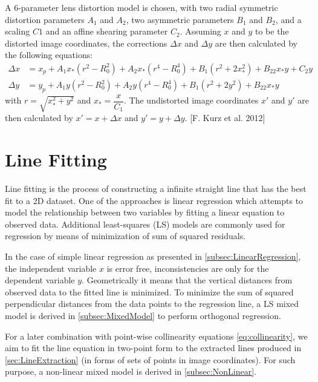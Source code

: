A 6-parameter lens distortion model is chosen, with two radial symmetric distortion parameters $A_1$ and $A_2$, two asymmetric parameters $B_1$ and $B_2$, and a scaling $C1$ and an affine shearing parameter $C_2$. Assuming $x$ and $y$ to be the distorted image coordinates, the corrections $\Delta x$ and $\Delta y$ are then calculated by the following equations:
\begin{equation} \label{eq:LensDistortion}
\begin{split}
\Delta x &= x_p + A_1x_*(r^2-R_0^2) + A_2x_*(r^4-R_0^4) + B_1(r^2+2x_*^2) + B_22x_*y+C_2y \\
\Delta y &= y_p + A_1y  (r^2-R_0^2) + A_2y  (r^4-R_0^4) + B_1(r^2+2y^2)   + B_22x_*y
\end{split}
\end{equation}
with $r=\sqrt{x_*^2+y^2}$ and $x_*=\dfrac{x}{C_1}$. The undistorted image coordinates $x\prime$ and $y\prime$ are then calculated by $x\prime=x+\Delta x$ and $y\prime=y+\Delta y$. [F. Kurz et al. 2012] 


\section{Line Fitting}
\label{sec:LineFitting}

Line fitting is the process of constructing a infinite straight line that has the best fit to a 2D dataset. One of the approaches is linear regression which attempts to model the relationship between two variables by fitting a linear equation to observed data. %
Additional least-squares (LS) models are commonly used for regression by means of minimization of sum of squared residuals.

In the case of simple linear regression as presented in \cref{subsec:LinearRegression}, the independent variable $x$ is error free, inconsistencies are only for the dependent variable $y$. Geometrically it means that the vertical distances from observed data to the fitted line is minimized. To minimize the sum of squared perpendicular distances from the data points to the regression line, a LS mixed model is derived in \cref{subsec:MixedModel} to perform orthogonal regression.

For a later combination with point-wise collinearity equations \eqref{eq:collinearity}, we aim to fit the line equation in two-point form to the extracted lines produced in \cref{sec:LineExtraction} (in forms of sets of points in image coordinates). For such purpose, a non-linear mixed model is derived in \cref{subsec:NonLinear}. 


